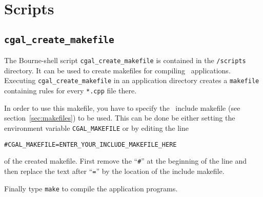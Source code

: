 \section{Scripts}

\subsection{\texttt{cgal\_create\_makefile\label{sec:create_cgal_makefile}}}

The Bourne-shell script \texttt{cgal\_create\_makefile} is contained in the
\cgaldir\texttt{/scripts} directory. It can be used to create
makefiles for compiling \cgal\ applications. Executing
\texttt{cgal\_create\_makefile} in an application directory creates a
\texttt{makefile} containing rules for every \texttt{*.cpp} file there.

In order to use this makefile, you have to specify the \cgal\ include
makefile (see section~\ref{sec:makefiles}) to be used. This can be
done be either setting the environment variable
\texttt{CGAL\_MAKEFILE} or by editing the line
\begin{alltt}
  # CGAL_MAKEFILE = ENTER_YOUR_INCLUDE_MAKEFILE_HERE
\end{alltt}
of the created makefile. First remove the ``\texttt{\#}'' at the
beginning of the line and then replace the text after ``\texttt{=}''
by the location of the include makefile. 

Finally type \texttt{make} to compile the application programs.



